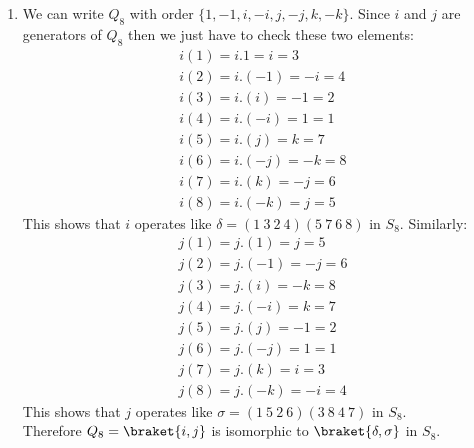 \begin{enumerate}[label=]
    \item 
        We can write $Q_8$ with order $\{1, -1, i, -i, j, -j, k, -k\}$. Since $i$ and $j$ are generators of $Q_8$ then we just have to check these two elements:
        \begin{gather*}
            i(1) = i.1 = i = 3 \\
            i(2) = i.(-1) = -i = 4 \\
            i(3) = i.(i) = -1 = 2 \\
            i(4) = i.(-i) = 1 = 1 \\
            i(5) = i.(j) = k = 7 \\
            i(6) = i.(-j) = -k = 8 \\
            i(7) = i.(k) = -j = 6 \\
            i(8) = i.(-k) = j = 5
        \end{gather*}
        This shows that $i$ operates like $\delta = (1 \ 3 \ 2 \ 4)(5 \ 7 \ 6 \ 8)$ in $S_8$. Similarly:
        \begin{gather*}
            j(1) = j.(1) = j = 5 \\
            j(2) = j.(-1) = -j = 6 \\
            j(3) = j.(i) = -k = 8 \\
            j(4) = j.(-i) = k = 7 \\
            j(5) = j.(j) = -1 = 2 \\
            j(6) = j.(-j) = 1 = 1 \\
            j(7) = j.(k) = i = 3 \\
            j(8) = j.(-k) = -i = 4
        \end{gather*}
        This shows that $j$ operates like $\sigma = (1 \ 5 \ 2 \ 6)(3 \ 8 \ 4 \ 7)$ in $S_8$. \\
        Therefore $Q_8 = \braket{i, j}$ is isomorphic to $\braket{\delta, \sigma}$ in $S_8$.
\end{enumerate}